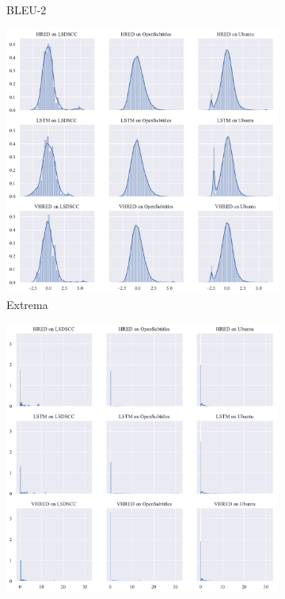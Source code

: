 \begin{figure}[H]
\begin{subfigure}{0.33\linewidth}
        \caption{BLEU-2}
    \end{subfigure}%
    \begin{subfigure}{0.33\linewidth}
        \includegraphics[width=\linewidth]{figure/distplot_grid/embedding_based_vector_extrema/plot.pdf}
        \centering
        \caption{Extrema}
    \end{subfigure}%
    \begin{subfigure}{0.33\linewidth}
        \centering
        \includegraphics[width=\linewidth]{figure/distplot_grid/rouge_2/plot.pdf}

\end{subfigure}
\end{figure}
